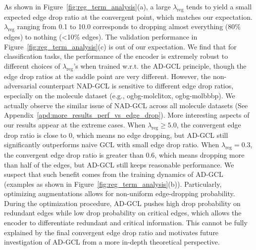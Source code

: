 As shown in Figure~\ref{fig:reg_term_analysis}(a), a large $\lambda_{\text{reg}}$ tends to yield a small expected edge drop ratio at the convergent point, which matches our expectation. $\lambda_{\text{reg}}$ ranging from 0.1 to 10.0 corresponds to dropping almost everything (80\% edges) to nothing (<10\% edges). The validation performance in %
Figure~\ref{fig:reg_term_analysis}(c) is out of our expectation. We find that for classification tasks, the performance of the encoder is extremely robust to different choices of $\lambda_{\text{reg}}$'s when trained w.r.t. the AD-GCL principle, though the edge drop ratios at the saddle point are very different. However, the non-adversarial counterpart NAD-GCL is sensitive to different edge drop ratios, especially on the molecule dataset (e.g., ogbg-molclitox, ogbg-molbbbp). We actually observe the similar issue of NAD-GCL across all molecule datasets (See Appendix~\ref{apd:more_results_perf_vs_edge_drop}). More interesting aspects of our results appear at the extreme cases. When $\lambda_{\text{reg}}\geq 5.0$, the convergent edge drop ratio is close to 0, which means no edge dropping, but AD-GCL still significantly outperforms naive GCL with small edge drop ratio. When $\lambda_{\text{reg}}=0.3$, the convergent edge drop ratio is greater than 0.6, which means dropping more than half of the edges, but AD-GCL still keeps reasonable performance. We suspect that such benefit comes from the training dynamics of AD-GCL (examples as shown in Figure~\ref{fig:reg_term_analysis}(b)). Particularly, optimizing augmentations allows for non-uniform edge-dropping probability. During the optimization procedure, AD-GCL pushes high drop probability on redundant edges while low drop probability on critical edges, which allows the encoder to differentiate redundant and critical information. This cannot be fully explained by the final convergent edge drop ratio %
 and motivates future investigation of AD-GCL from a more in-depth theoretical perspective. 
\vspace{-3mm}
